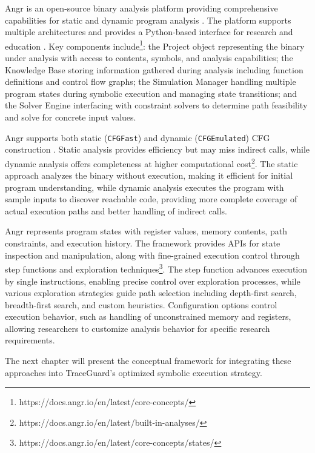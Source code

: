 Angr is an open-source binary analysis platform providing comprehensive capabilities for static and dynamic program analysis \cite{shoshitaishvili_sok_2016}. The platform supports multiple architectures and provides a Python-based interface for research and education \cite{springer_teaching_2018}. Key components include\footnote{https://docs.angr.io/en/latest/core-concepts/}: the Project object representing the binary under analysis with access to contents, symbols, and analysis capabilities; the Knowledge Base storing information gathered during analysis including function definitions and control flow graphs; the Simulation Manager handling multiple program states during symbolic execution and managing state transitions; and the Solver Engine interfacing with constraint solvers to determine path feasibility and solve for concrete input values.

Angr supports both static (\texttt{CFGFast}) and dynamic (\texttt{CFGEmulated}) CFG construction \cite{angr_cfg_analysis}. Static analysis provides efficiency but may miss indirect calls, while dynamic analysis offers completeness at higher computational cost\footnote{https://docs.angr.io/en/latest/built-in-analyses/}. The static approach analyzes the binary without execution, making it efficient for initial program understanding, while dynamic analysis executes the program with sample inputs to discover reachable code, providing more complete coverage of actual execution paths and better handling of indirect calls.

Angr represents program states with register values, memory contents, path constraints, and execution history. The framework provides APIs for state inspection and manipulation, along with fine-grained execution control through step functions and exploration techniques\footnote{https://docs.angr.io/en/latest/core-concepts/states/}. The step function advances execution by single instructions, enabling precise control over exploration processes, while various exploration strategies guide path selection including depth-first search, breadth-first search, and custom heuristics. Configuration options control execution behavior, such as handling of unconstrained memory and registers, allowing researchers to customize analysis behavior for specific research requirements.

The next chapter will present the conceptual framework for integrating these approaches into TraceGuard's optimized symbolic execution strategy.
